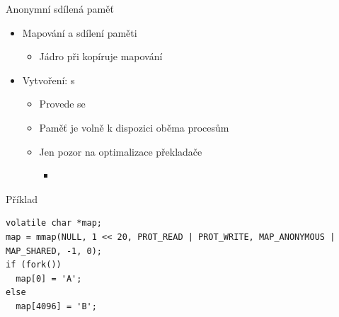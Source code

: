 
\begin{frame}[fragile]{Anonymní sdílená paměť}

  \begin{itemize}
    \item Mapování a sdílení paměti
    \begin{itemize}
      \item Jádro při  kopíruje mapování
    \end{itemize}

    \pause

    \item Vytvoření:  s 
    \begin{itemize}
      \item Provede se 
      \item Paměť je volně k dispozici oběma procesům

      \pause

      \item Jen pozor na optimalizace překladače
      \begin{itemize}
	\item {}
      \end{itemize}
    \end{itemize}
  \end{itemize}

  \begin{block}{Příklad}
  \begin{lstlisting}
volatile char *map;
map = mmap(NULL, 1 << 20, PROT_READ | PROT_WRITE, MAP_ANONYMOUS | MAP_SHARED, -1, 0);
if (fork())
  map[0] = 'A';
else
  map[4096] = 'B';
  \end{lstlisting}
  \end{block}

\end{frame}

